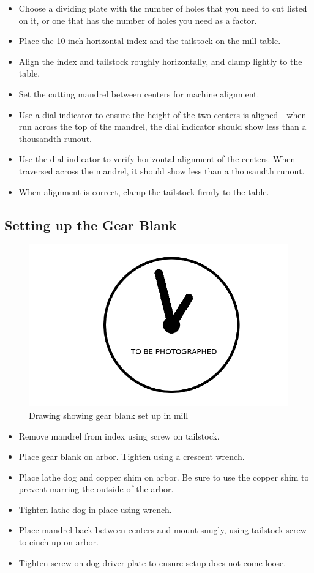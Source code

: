 \documentclass[12pt,twoside,letterpaper]{article}
\begin{document}
\begin{itemize}
	\item Choose a dividing plate with the number of holes that you need to cut listed on it, or one that has the number of holes you need as a factor.
	\item Place the 10 inch horizontal index and the tailstock on the mill table.
	\item Align the index and tailstock roughly horizontally, and clamp lightly to the table.
	\item Set the cutting mandrel between centers for machine alignment.
	\item Use a dial indicator to ensure the height of the two centers is aligned - when run across the top of the mandrel, the dial indicator should show less than a thousandth runout.
	\item Use the dial indicator to verify horizontal alignment of the centers. When traversed across the mandrel, it should show less than a thousandth runout.
	\item When alignment is correct, clamp the tailstock firmly to the table.
\end{itemize}

\subsection{Setting up the Gear Blank}
\begin{figure}[H]
\centering
\includegraphics[width=5in]{imgpending}
\caption{Drawing showing gear blank set up in mill}
\end{figure}
\begin{itemize}
	\item Remove mandrel from index using screw on tailstock.
	\item Place gear blank on arbor. Tighten using a crescent wrench.
	\item Place lathe dog and copper shim on arbor. Be sure to use the copper shim to prevent marring the outside of the arbor.
	\item Tighten lathe dog in place using wrench.
	\item Place mandrel back between centers and mount snugly, using tailstock screw to cinch up on arbor.
	\item Tighten screw on dog driver plate to ensure setup does not come loose.
\end{itemize}
\end{document}
